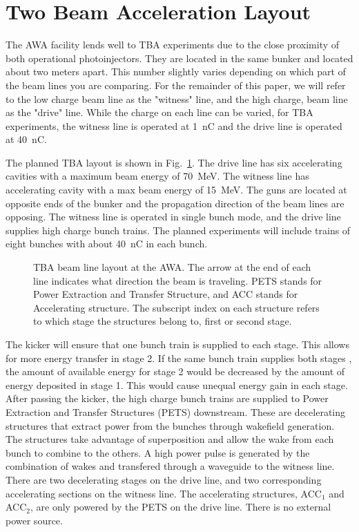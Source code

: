 \documentclass[letterpaper,  %
              ]{jacow-2_3}   %
\begin{document}
\section{Two Beam Acceleration Layout}
The AWA facility lends well to TBA experiments due to the 
close proximity of both operational photoinjectors. 
They are located in the same bunker and located about two meters apart.
This number slightly varies depending on which part of the beam 
lines you are comparing. For the remainder of this paper, we will
refer to the low charge beam line as the "witness" line, 
and the high charge, beam line as the "drive" line.
While the charge on each line can be varied, for TBA experiments, 
the witness line is operated at \SI{1}{nC} and the drive line
is operated at \SI{40}{nC}.

The planned TBA layout is shown in Fig.~\ref{beamline}.
The drive line has six accelerating 
cavities with a maximum beam energy of \SI{70}{MeV}. 
The witness line has accelerating cavity with a max beam energy of \SI{15}{MeV}.
The guns are located at opposite ends of the bunker and 
the propagation direction of the beam lines are opposing.
The witness line is operated in single bunch mode, and 
the drive line supplies high charge bunch trains. 
The planned experiments will include trains of eight bunches
with about \SI{40}{nC} in each bunch.

\begin{figure}[!tbh]
	\centering
	\begin{tikzpicture}[scale=\textwidth/33cm, text=black]
	
	\end{tikzpicture}
	\caption{TBA beam line layout at the AWA. The arrow at the end of each line indicates what direction the beam is traveling.
		PETS stands for Power Extraction and Transfer Structure, and ACC
		stands for Accelerating structure. The subscript index on each structure refers to which stage the structures belong to, first or second stage. }
	\label{beamline}
\end{figure}

The kicker will ensure that one bunch train is supplied to 
each stage. This allows for more energy transfer in stage 2.
If the same bunch train supplies both stages \cite{tba}, the amount
of available energy for stage 2 would be decreased by the 
amount of energy deposited in stage 1. This would cause
unequal energy gain in each stage.
After passing the kicker, 
the high charge bunch trains are supplied to Power Extraction
and Transfer Structures (PETS) downstream. These are decelerating 
structures that extract power from the bunches through wakefield generation.
The structures take advantage of superposition and allow the wake from each 
bunch to combine to the others. A high power pulse is generated by 
the combination of wakes and transfered through a waveguide to the 
witness line. 
There are two decelerating stages on the drive line, and two 
corresponding accelerating sections on the witness line.
The accelerating structures, ACC$_1$ and ACC$_2$, are only 
powered by the PETS on the drive line. There is no  
external power source. 
\end{document}
